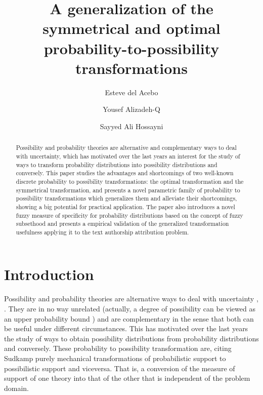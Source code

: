 \documentclass[a4paper]{article}
\title{A generalization of the symmetrical and optimal probability-to-possibility transformations}
\author[1]{Esteve del Acebo}
\affil[1]{VICOROB Institute, Universitat de Girona}
\author[2]{Yousef Alizadeh-Q}
\author[2]{Sayyed  Ali Hossayni}
\affil[2]{Data Mining Lab, School of Computer Engineering.  \authorcr Iran University of Science and Technology}
\begin{document}
\maketitle

\begin{abstract}

Possibility and probability theories are alternative and complementary ways to deal with uncertainty, which has motivated over the last years an interest for the study of ways to transform probability distributions into possibility distributions and conversely. This paper studies the advantages and shortcomings of two well-known discrete probability to possibility transformations: the optimal transformation and the symmetrical transformation, and presents a novel parametric family of probability to possibility transformations which generalizes them and alleviate their shortcomings, showing a big potential for practical application. The paper also introduces a novel fuzzy measure of specificity for probability distributions based on the concept of fuzzy subsethood and presents a empirical validation of the generalized transformation usefulness applying it to the text authorship attribution problem. 
\end{abstract}

\section{Introduction}

Possibility and probability theories are alternative ways to deal with uncertainty \cite{zadeh78}, \cite{Dubois:2007}. They are in no way unrelated (actually, a degree of possibility can be viewed as an upper probability bound  \cite{Dubois1993}) and are complementary in the sense that both can be useful under different circumstances. This has motivated over the last years the study of ways to obtain possibility distributions from probability distributions and conversely. These probability to possibility transformation are, citing Sudkamp \cite{SUDKAMP199273} purely mechanical transformations of probabilistic support to possibilistic support and viceversa. That is, a conversion of the measure of support of one theory into that of the other that is independent of the problem domain.
\end{document}
